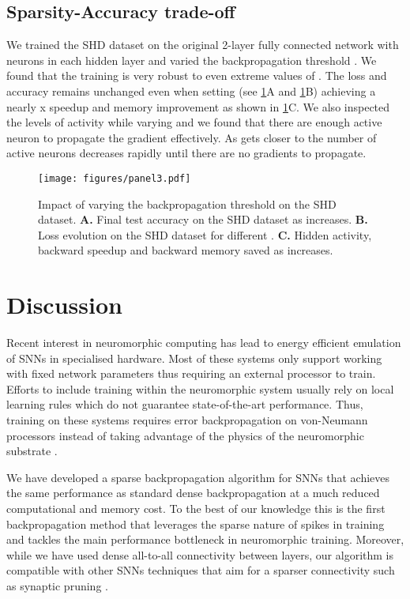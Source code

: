 \documentclass{article}
\begin{document}
\subsection{Sparsity-Accuracy trade-off}

We trained the SHD dataset on the original 2-layer fully connected network with  neurons in each hidden layer and varied the backpropagation threshold . We found that the training is very robust to even extreme values of . The loss and accuracy remains unchanged even when setting  (see \ref{fig:panel3}A and \ref{fig:panel3}B) achieving a nearly x speedup and  memory improvement as shown in \ref{fig:panel3}C. We also inspected the levels of activity while varying  and we found that there are enough active neuron to propagate the gradient effectively. As  gets closer to  the number of active neurons decreases rapidly until there are no gradients to propagate. 

\begin{figure}[!tb]
\centering
\texttt{[image: figures/panel3.pdf]}
\caption{Impact of varying the backpropagation threshold  on the SHD dataset.
\textbf{A.}  Final test accuracy on the SHD dataset as  increases. \textbf{B.} Loss evolution on the SHD dataset for different . \textbf{C.} Hidden activity, backward speedup and backward memory saved as  increases.}
\label{fig:panel3}
\end{figure}

\section{Discussion}\label{section:discussion}
\vspace{-0.1cm}
Recent interest in neuromorphic computing has lead to energy efficient emulation of SNNs in specialised hardware. Most of these systems only support working with fixed network parameters thus requiring an external processor to train. Efforts to include training within the neuromorphic system usually rely on local learning rules which do not guarantee state-of-the-art performance. Thus, training on these systems requires error backpropagation on von-Neumann processors instead of taking advantage of the physics of the neuromorphic substrate \cite{indiveri2015memory, demirag2021pcm}.

We have developed a sparse backpropagation algorithm for SNNs that achieves the same performance as standard dense backpropagation at a much reduced computational and memory cost. To the best of our knowledge this is the first backpropagation method that leverages the sparse nature of spikes in training and tackles the main performance bottleneck in neuromorphic training. Moreover, while we have used dense all-to-all connectivity between layers, our algorithm is compatible with other SNNs techniques that aim for a sparser connectivity such as synaptic pruning \cite{chen2021pruning}.
\end{document}

